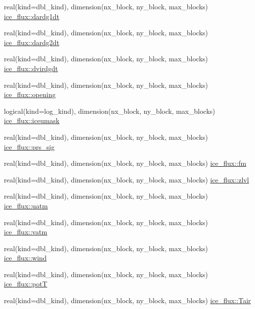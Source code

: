\begin{DoxyCompactItemize}
\item 
real(kind=dbl\_\-kind), dimension(nx\_\-block, ny\_\-block, max\_\-blocks) \hyperlink{namespaceice__flux_ac0303bfce72171bb93ea1a621dc453eb}{ice\_\-flux::dardg1dt}
\item 
real(kind=dbl\_\-kind), dimension(nx\_\-block, ny\_\-block, max\_\-blocks) \hyperlink{namespaceice__flux_a8d3dec0f51ebd0b3aaf71909b190656a}{ice\_\-flux::dardg2dt}
\item 
real(kind=dbl\_\-kind), dimension(nx\_\-block, ny\_\-block, max\_\-blocks) \hyperlink{namespaceice__flux_ade5480c0fdf0d8989ec199ab6c494df2}{ice\_\-flux::dvirdgdt}
\item 
real(kind=dbl\_\-kind), dimension(nx\_\-block, ny\_\-block, max\_\-blocks) \hyperlink{namespaceice__flux_ae0a39366aa114290bad9340508d55fd7}{ice\_\-flux::opening}
\item 
logical(kind=log\_\-kind), dimension(nx\_\-block, ny\_\-block, max\_\-blocks) \hyperlink{namespaceice__flux_a2c8f3b751fc60ac7a93605e6bb887b0f}{ice\_\-flux::iceumask}
\item 
real(kind=dbl\_\-kind), dimension(nx\_\-block, ny\_\-block, max\_\-blocks) \hyperlink{namespaceice__flux_a4406d054e8437ab55dc01d6e5b9c8882}{ice\_\-flux::prs\_\-sig}
\item 
real(kind=dbl\_\-kind), dimension(nx\_\-block, ny\_\-block, max\_\-blocks) \hyperlink{namespaceice__flux_aa2cb3a98eac5adcd5441f55fe26be618}{ice\_\-flux::fm}
\item 
real(kind=dbl\_\-kind), dimension(nx\_\-block, ny\_\-block, max\_\-blocks) \hyperlink{namespaceice__flux_a760e7ef6ee3c277e293ab9a2f92685cb}{ice\_\-flux::zlvl}
\item 
real(kind=dbl\_\-kind), dimension(nx\_\-block, ny\_\-block, max\_\-blocks) \hyperlink{namespaceice__flux_accb62713c4d53aa9f56bccfa4faf6507}{ice\_\-flux::uatm}
\item 
real(kind=dbl\_\-kind), dimension(nx\_\-block, ny\_\-block, max\_\-blocks) \hyperlink{namespaceice__flux_ace0435fd53553a1cae783a932576a39f}{ice\_\-flux::vatm}
\item 
real(kind=dbl\_\-kind), dimension(nx\_\-block, ny\_\-block, max\_\-blocks) \hyperlink{namespaceice__flux_a1f1bd9712740289c1c1348265a70e838}{ice\_\-flux::wind}
\item 
real(kind=dbl\_\-kind), dimension(nx\_\-block, ny\_\-block, max\_\-blocks) \hyperlink{namespaceice__flux_a81beec3343cd05b99ad439d5586d6156}{ice\_\-flux::potT}
\item 
real(kind=dbl\_\-kind), dimension(nx\_\-block, ny\_\-block, max\_\-blocks) \hyperlink{namespaceice__flux_add98ec71fa0c35dbd9a7afcfa897081d}{ice\_\-flux::Tair}

\end{DoxyCompactItemize}
